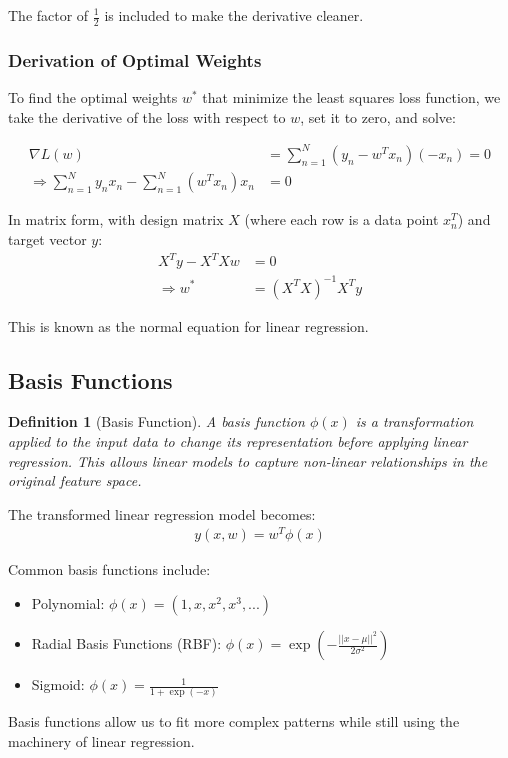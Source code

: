 \documentclass{article}
\newtheorem{definition}{Definition}
\begin{document}
The factor of $\frac{1}{2}$ is included to make the derivative cleaner.

\subsubsection{Derivation of Optimal Weights}
To find the optimal weights $w^*$ that minimize the least squares loss function, we take the derivative of the loss with respect to $w$, set it to zero, and solve:

\begin{align}
\nabla L(w) &= \sum_{n=1}^{N}(y_n - w^Tx_n)(-x_n) = 0\\
\Rightarrow \sum_{n=1}^{N}y_nx_n - \sum_{n=1}^{N}(w^Tx_n)x_n &= 0
\end{align}

In matrix form, with design matrix $X$ (where each row is a data point $x_n^T$) and target vector $y$:
\begin{align}
X^Ty - X^TXw &= 0\\
\Rightarrow w^* &= (X^TX)^{-1}X^Ty
\end{align}

This is known as the normal equation for linear regression.

\subsection{Basis Functions}
\begin{definition}[Basis Function]
A basis function $\phi(x)$ is a transformation applied to the input data to change its representation before applying linear regression. This allows linear models to capture non-linear relationships in the original feature space.
\end{definition}

The transformed linear regression model becomes:
\begin{align}
y(x,w) = w^T\phi(x)
\end{align}

Common basis functions include:
\begin{itemize}
\item Polynomial: $\phi(x) = (1, x, x^2, x^3, ...)$
\item Radial Basis Functions (RBF): $\phi(x) = \exp\left(-\frac{||x-\mu||^2}{2\sigma^2}\right)$
\item Sigmoid: $\phi(x) = \frac{1}{1+\exp(-x)}$
\end{itemize}

Basis functions allow us to fit more complex patterns while still using the machinery of linear regression.
\end{document}
